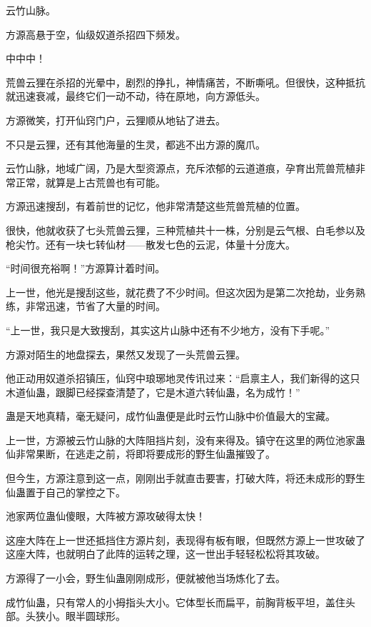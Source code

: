 
\begin{this_body}

云竹山脉。

方源高悬于空，仙级奴道杀招四下频发。

中中中！

荒兽云狸在杀招的光晕中，剧烈的挣扎，神情痛苦，不断嘶吼。但很快，这种抵抗就迅速衰减，最终它们一动不动，待在原地，向方源低头。

方源微笑，打开仙窍门户，云狸顺从地钻了进去。

不只是云狸，还有其他海量的生灵，都逃不出方源的魔爪。

云竹山脉，地域广阔，乃是大型资源点，充斥浓郁的云道道痕，孕育出荒兽荒植非常正常，就算是上古荒兽也有可能。

方源迅速搜刮，有着前世的记忆，他非常清楚这些荒兽荒植的位置。

很快，他就收获了七头荒兽云狸，三种荒植共十一株，分别是云气根、白毛参以及枪尖竹。还有一块七转仙材——散发七色的云泥，体量十分庞大。

“时间很充裕啊！”方源算计着时间。

上一世，他光是搜刮这些，就花费了不少时间。但这次因为是第二次抢劫，业务熟练，非常迅速，节省了大量的时间。

“上一世，我只是大致搜刮，其实这片山脉中还有不少地方，没有下手呢。”

方源对陌生的地盘探去，果然又发现了一头荒兽云狸。

他正动用奴道杀招镇压，仙窍中琅琊地灵传讯过来：“启禀主人，我们新得的这只木道仙蛊，跟脚已经探查清楚了，它是木道六转仙蛊，名为成竹！”

蛊是天地真精，毫无疑问，成竹仙蛊便是此时云竹山脉中价值最大的宝藏。

上一世，方源被云竹山脉的大阵阻挡片刻，没有来得及。镇守在这里的两位池家蛊仙非常果断，在逃走之前，将即将要成形的野生仙蛊摧毁了。

但今生，方源注意到这一点，刚刚出手就直击要害，打破大阵，将还未成形的野生仙蛊置于自己的掌控之下。

池家两位蛊仙傻眼，大阵被方源攻破得太快！

这座大阵在上一世还抵挡住方源片刻，表现得有板有眼，但既然方源上一世攻破了这座大阵，也就明白了此阵的运转之理，这一世出手轻轻松松将其攻破。

方源得了一小会，野生仙蛊刚刚成形，便就被他当场炼化了去。

成竹仙蛊，只有常人的小拇指头大小。它体型长而扁平，前胸背板平坦，盖住头部。头狭小。眼半圆球形。


\end{this_body}
